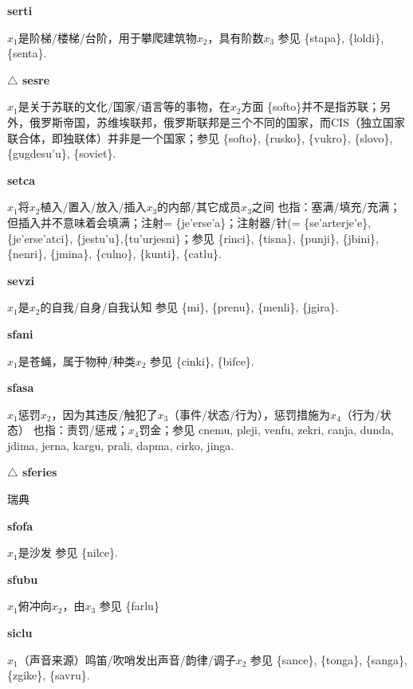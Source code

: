 \documentclass[notitlepage,twocolumn,a4paper,10pt]{book}
\begin{document}
{\sffamily\bfseries serti}\enspace {\ttfamily\bfseries[ser]}  $x_1$是阶梯\slash{}楼梯\slash{}台阶，用于攀爬建筑物$x_2$，具有阶数$x_3$ \textemdash{} 参见 \{stapa\}, \{loldi\}, \{senta\}.

{\sffamily\bfseries $\triangle$ sesre} $x_1$是关于苏联的文化\slash{}国家\slash{}语言等的事物，在$x_2$方面 \textemdash{} \{softo\}并不是指苏联；另外，俄罗斯帝国，苏维埃联邦，俄罗斯联邦是三个不同的国家，而CIS（独立国家联合体，即独联体）并非是一个国家；参见 \{softo\}, \{rusko\}, \{vukro\}, \{slovo\}, \{gugdesu'u\}, \{soviet\}.

{\sffamily\bfseries setca}\enspace {\ttfamily\bfseries[        se'a]}  $x_1$将$x_2$植入\slash{}置入\slash{}放入\slash{}插入$x_3$的内部\slash{}其它成员$x_3$之间 \textemdash{} 也指：塞满\slash{}填充\slash{}充满；但插入并不意味着会填满；注射= \{je'erse'a\}；注射器\slash{}针(= \{se'arterje'e\}, \{je'erse'atci\}, \{jestu'u\},\{tu'urjesni\}；参见 \{rinci\}, \{tisna\}, \{punji\}, \{jbini\}, \{nenri\}, \{jmina\}, \{culno\}, \{kunti\}, \{catlu\}.

{\sffamily\bfseries sevzi}\enspace {\ttfamily\bfseries[sez     se'i]}  $x_1$是$x_2$的自我\slash{}自身\slash{}自我认知 \textemdash{} 参见 \{mi\}, \{prenu\}, \{menli\}, \{jgira\}.

{\sffamily\bfseries sfani} $x_1$是苍蝇，属于物种\slash{}种类$x_2$ \textemdash{} 参见 \{cinki\}, \{bifce\}.

{\sffamily\bfseries sfasa}\enspace {\ttfamily\bfseries[    sfa]}  $x_1$惩罚$x_2$，因为其违反\slash{}触犯了$x_3$（事件\slash{}状态\slash{}行为），惩罚措施为$x_4$（行为\slash{}状态） \textemdash{} 也指：责罚\slash{}惩戒；$x_4$罚金；参见 {cnemu}, {pleji}, {venfu}, {zekri}, {canja}, {dunda}, {jdima}, {jerna}, {kargu}, {prali}, {dapma}, {cirko}, {jinga}.

{\sffamily\bfseries $\triangle$ sferies} 瑞典

{\sffamily\bfseries sfofa}\enspace {\ttfamily\bfseries[    sfo]}  $x_1$是沙发 \textemdash{} 参见 \{nilce\}.

{\sffamily\bfseries sfubu}\enspace {\ttfamily\bfseries[sub     su'u]}  $x_1$俯冲向$x_2$，由$x_3$ \textemdash{} 参见 \{farlu\}

{\sffamily\bfseries siclu}\enspace {\ttfamily\bfseries[sil]}  $x_1$（声音来源）鸣笛\slash{}吹哨发出声音\slash{}韵律\slash{}调子$x_2$ \textemdash{} 参见 \{sance\}, \{tonga\}, \{sanga\}, \{zgike\}, \{savru\}.
\end{document}
